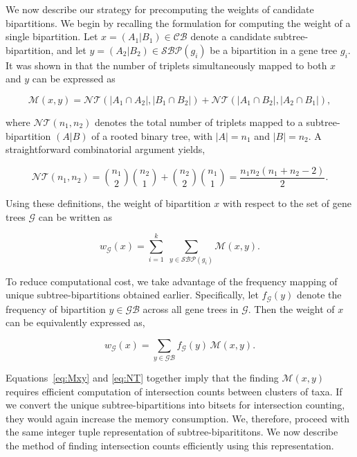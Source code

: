 \documentclass[10pt,a4paper]{article}
\begin{document}
We now describe our strategy for precomputing the weights of candidate bipartitions. We begin by recalling the formulation for computing the weight of a single bipartition. Let $x = (A_1|B_1) \in \mathcal{CB}$ denote a candidate subtree-bipartition, and let $y = (A_2|B_2) \in \mathcal{SBP}(g_i)$ be a bipartition in a gene tree $g_i$. It was shown in \cite{stelar} that the number of triplets simultaneously mapped to both $x$ and $y$ can be expressed as

\begin{equation}
\mathcal{M}(x,y) = \mathcal{NT}(|A_{1} \cap A_{2}|, |B_{1} \cap B_{2}|) 
+ \mathcal{NT}(|A_{1} \cap B_{2}|, |A_{2} \cap B_{1}|),
\label{eq:Mxy}
\end{equation}

where $\mathcal{NT}(n_1,n_2)$ denotes the total number of triplets mapped to a subtree-bipartition $(A|B)$ of a rooted binary tree, with $|A| = n_1$ and $|B| = n_2$. A straightforward combinatorial argument yields,

\begin{equation}
\mathcal{NT}(n_1, n_2) = \binom{n_1}{2}\binom{n_2}{1} + \binom{n_2}{2}\binom{n_1}{1} 
= \frac{n_1 n_2 (n_1 + n_2 - 2)}{2}.
\label{eq:NT}
\end{equation}

Using these definitions, the weight of bipartition $x$ with respect to the set of gene trees $\mathcal{G}$ can be written as

\begin{equation}
w_{\mathcal{G}}(x) = \sum_{i=1}^{k} \; \sum_{y \in \mathcal{SBP}(g_i)} \mathcal{M}(x,y).
\end{equation}

To reduce computational cost, we take advantage of the frequency mapping of unique subtree-bipartitions obtained earlier. Specifically, let $f_{\mathcal{G}}(y)$ denote the frequency of bipartition $y \in \mathcal{GB}$ across all gene trees in $\mathcal{G}$. Then the weight of $x$ can be equivalently expressed as,

\begin{equation}
w_{\mathcal{G}}(x) = \sum_{y \in \mathcal{GB}} f_{\mathcal{G}}(y)\,\mathcal{M}(x,y).
\label{eq:effcal}
\end{equation}


Equations~\eqref{eq:Mxy} and \eqref{eq:NT} together imply that the finding $\mathcal{M}(x,y)$ requires efficient computation of intersection counts between clusters of taxa. If we convert the unique subtree-bipartitions into bitsets for intersection counting, they would again increase the memory consumption. We, therefore, proceed with the same integer tuple representation of subtree-biparititons. We now describe the method of finding intersection counts efficiently using this representation. 
\end{document}
